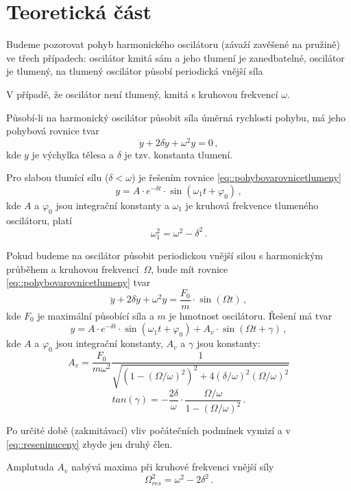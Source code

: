 \section*{Teoretická část}

Budeme pozorovat pohyb harmonického oscilátoru (závaží zavěšené na pružině) ve třech případech: oscilátor kmitá sám a jeho tlumení je zanedbatelné, oscilátor je tlumený, na tlumený oscilátor působí periodická vnější síla

V případě, že oscilátor není tlumený, kmitá s kruhovou frekvencí $\omega$.

Působí-li na harmonický oscilátor působit síla úměrná rychlosti pohybu, má jeho pohybová rovnice tvar
\begin{equation} \label{eq::pohybovarovnicetlumeny}
\ddot{y}+2\delta \dot{y}+\omega^2y=0 \,,
\end{equation}
kde $y$ je výchylka tělesa a $\delta$ je tzv. konstanta tlumení.

Pro slabou tlumící sílu ($\delta<\omega$) je řešením rovnice \eqref{eq::pohybovarovnicetlumeny}
\begin{equation}
y= A\cdot e^{-\delta t} \cdot \sin(\omega_1t+\varphi_0) \,,
\end{equation}
kde $A$ a $\varphi_0$ jsou integrační konstanty a $\omega_1$ je kruhová frekvence tlumeného oscilátoru, platí \cite{skripta}
\begin{equation} \label{eq::omega1}
\omega_1^2 = \omega^2 - \delta^2 \,.
\end{equation}

Pokud budeme na oscilátor působit periodickou vnější silou s harmonickým průběhem a kruhovou frekvencí~$\Omega$, bude mít rovnice \eqref{eq::pohybovarovnicetlumeny} tvar
\begin{equation}
\ddot{y} + 2\delta \dot{y} + \omega^2 y = \frac{F_0}{m}\cdot \sin(\Omega t) \,,
\end{equation}
kde $F_0$ je maximální působící síla a $m$ je hmotnost oscilátoru.
Řešení má tvar \cite{skripta}
\begin{equation} \label{eq::reseninuceny}
y=A \cdot e^{-\delta t} \cdot \sin (\omega_1 t+ \varphi_0) + A_v \cdot \sin (\Omega t + \gamma) \,,
\end{equation}
kde $A$ a $\varphi_0$ jsou integrační konstanty, $A_v$ a $\gamma$ jsou konstanty: \cite{skripta}
\begin{equation}
A_v=\frac{F_0}{m \omega^2} \frac{1}{\sqrt{
\left( 1- (\Omega/\omega)^2  \right)^2 +
4 (\delta/\omega)^2(\Omega/\omega)^2
}} 
\end{equation}
\begin{equation}
tan (\gamma) =- \frac{2\delta}{\omega}\cdot \frac{\Omega/\omega}{1-(\Omega/\omega)^2} \,.
\end{equation}

Po určité době (zakmitávací) vliv počátečních podmínek vymizí a v \eqref{eq::reseninuceny} zbyde jen druhý člen.

Amplutuda $A_v$ nabývá maxima při kruhové frekvenci vnější síly
\begin{equation} \label{eq::resomega}
\Omega_{res}^2 = \omega^2-2\delta^2 \,.
\end{equation}